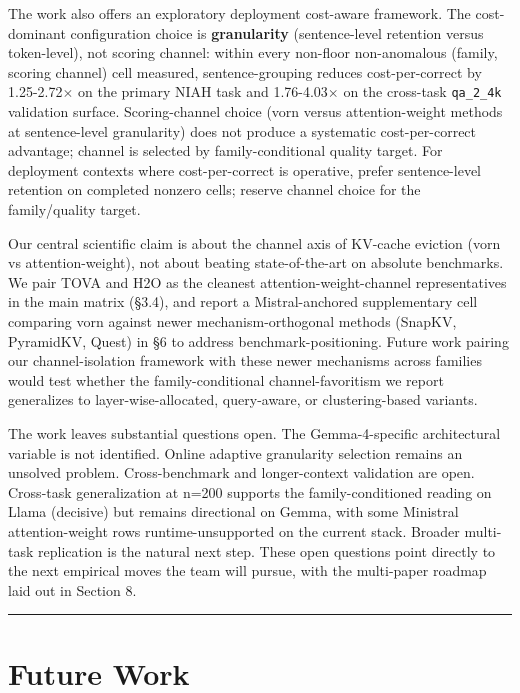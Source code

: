 \documentclass[10pt]{article}
\begin{document}
The work also offers an exploratory deployment cost-aware framework. The
cost-dominant configuration choice is \textbf{granularity}
(sentence-level retention versus token-level), not scoring channel:
within every non-floor non-anomalous (family, scoring channel) cell
measured, sentence-grouping reduces cost-per-correct by 1.25-2.72$\times$ on
the primary NIAH task and 1.76-4.03$\times$ on the cross-task
\texttt{qa\_2\_4k} validation surface. Scoring-channel choice (vorn
versus attention-weight methods at sentence-level granularity) does not
produce a systematic cost-per-correct advantage; channel is selected by
family-conditional quality target. For deployment contexts where
cost-per-correct is operative, prefer sentence-level retention on
completed nonzero cells; reserve channel choice for the family/quality
target.

Our central scientific claim is about the channel axis of KV-cache
eviction (vorn vs attention-weight), not about beating
state-of-the-art on absolute benchmarks. We pair TOVA and
H2O as the cleanest attention-weight-channel representatives in
the main matrix (\S{}3.4), and report a Mistral-anchored supplementary cell
comparing vorn against newer mechanism-orthogonal methods (SnapKV,
PyramidKV, Quest) in \S{}6 to address benchmark-positioning. Future work
pairing our channel-isolation framework with these newer mechanisms
across families would test whether the family-conditional
channel-favoritism we report generalizes to layer-wise-allocated,
query-aware, or clustering-based variants.

The work leaves substantial questions open. The Gemma-4-specific
architectural variable is not identified. Online adaptive granularity
selection remains an unsolved problem. Cross-benchmark and
longer-context validation are open. Cross-task generalization at n=200
supports the family-conditioned reading on Llama (decisive) but remains
directional on Gemma, with some Ministral attention-weight rows
runtime-unsupported on the current stack. Broader multi-task replication
is the natural next step. These open questions point directly to the
next empirical moves the team will pursue, with the multi-paper roadmap
laid out in Section 8.

\begin{center}\rule{0.5\linewidth}{0.5pt}\end{center}

\section{Future Work}\label{8-future-work}
\end{document}
